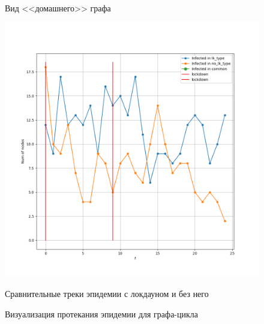 \begin{figure}[h]
\begin{center}
\begin{minipage}{0.49\linewidth}
				\centering
				Вид <<домашнего>> графа
			\end{minipage}
		\end{center}
		
		\begin{center}
			\begin{minipage}{0.8\linewidth}
				\includegraphics[width=\linewidth, keepaspectratio]{../figs/evidence3/tracks}
				
				\centering
				Сравнительные треки эпидемии с локдауном и без него
			\end{minipage}
		\end{center}
		
		\caption{Визуализация протекания эпидемии для графа-цикла}\label{pic:evidence_2}
	\end{figure}
	
